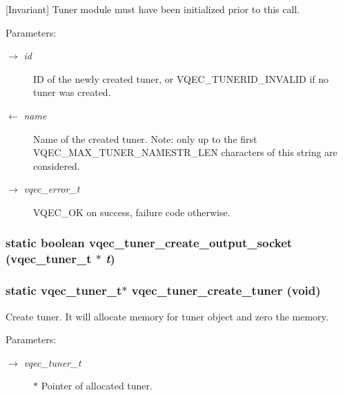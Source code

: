 [Invariant] Tuner module must have been initialized prior to this call. \begin{Desc}
\item[Parameters:]
\begin{description}
\item[\mbox{$\rightarrow$} {\em id}]ID of the newly created tuner, or VQEC\_\-TUNERID\_\-INVALID if no tuner was created. \item[\mbox{$\leftarrow$} {\em name}]Name of the created tuner. Note: only up to the first VQEC\_\-MAX\_\-TUNER\_\-NAMESTR\_\-LEN characters of this string are considered. \item[\mbox{$\rightarrow$} {\em vqec\_\-error\_\-t}]VQEC\_\-OK on success, failure code otherwise. \end{description}
\end{Desc}
\subsubsection{\setlength{\rightskip}{0pt plus 5cm}static boolean vqec\_\-tuner\_\-create\_\-output\_\-socket (\bf{vqec\_\-tuner\_\-t} $\ast$ {\em t})\hspace{0.3cm}{\tt  [static]}}\label{vqec__tuner_8c_7b84795ed9ba91d2270e240acab12e3c}


\subsubsection{\setlength{\rightskip}{0pt plus 5cm}static \bf{vqec\_\-tuner\_\-t}$\ast$ vqec\_\-tuner\_\-create\_\-tuner (void)\hspace{0.3cm}{\tt  [static]}}\label{vqec__tuner_8c_07bf86129dc702a10ab08bde207e3780}


Create tuner. It will allocate memory for tuner object and zero the memory.

\begin{Desc}
\item[Parameters:]
\begin{description}
\item[\mbox{$\rightarrow$} {\em vqec\_\-tuner\_\-t}]$\ast$ Pointer of allocated tuner. \end{description}
\end{Desc}
